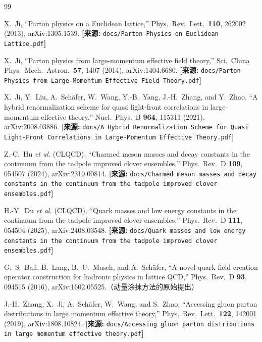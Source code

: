 \documentclass[12pt,a4paper]{ctexart}
\theoremstyle{definition}
\begin{document}
\begin{thebibliography}{99}

X.~Ji,
``Parton physics on a Euclidean lattice,''
Phys.\ Rev.\ Lett.\ \textbf{110}, 262002 (2013), arXiv:1305.1539.
\quad\textbf{[来源:} \texttt{docs/Parton Physics on Euclidean Lattice.pdf}\textbf{]}

X.~Ji,
``Parton physics from large-momentum effective field theory,''
Sci.\ China Phys.\ Mech.\ Astron.\ \textbf{57}, 1407 (2014), arXiv:1404.6680.
\quad\textbf{[来源:} \texttt{docs/Parton Physics from Large-Momentum Effective Field Theory.pdf}\textbf{]}

X.~Ji, Y.~Liu, A.~Sch\"afer, W.~Wang, Y.-B.~Yang, J.-H.~Zhang, and Y.~Zhao,
``A hybrid renormalization scheme for quasi light-front correlations in large-momentum effective theory,''
Nucl.\ Phys.\ B \textbf{964}, 115311 (2021), arXiv:2008.03886.
\quad\textbf{[来源:} \texttt{docs/A Hybrid Renormalization Scheme for Quasi Light-Front Correlations in Large-Momentum Effective Theory.pdf}\textbf{]}


Z.-C.~Hu \textit{et al.} (CLQCD),
``Charmed meson masses and decay constants in the continuum from the tadpole improved clover ensembles,''
Phys.\ Rev.\ D \textbf{109}, 054507 (2024), arXiv:2310.00814.
\quad\textbf{[来源:} \texttt{docs/Charmed meson masses and decay constants in the continuum from the tadpole improved clover ensembles.pdf}\textbf{]}

H.-Y.~Du \textit{et al.} (CLQCD),
``Quark masses and low energy constants in the continuum from the tadpole improved clover ensembles,''
Phys.\ Rev.\ D \textbf{111}, 054504 (2025), arXiv:2408.03548.
\quad\textbf{[来源:} \texttt{docs/Quark masses and low energy constants in the continuum from the tadpole improved clover ensembles.pdf}\textbf{]}


G.~S.~Bali, B.~Lang, B.~U.~Musch, and A.~Sch\"afer,
``A novel quark-field creation operator construction for hadronic physics in lattice QCD,''
Phys.\ Rev.\ D \textbf{93}, 094515 (2016), arXiv:1602.05525.（动量涂抹方法的原始提出）

J.-H.~Zhang, X.~Ji, A.~Sch\"afer, W.~Wang, and S.~Zhao,
``Accessing gluon parton distributions in large momentum effective theory,''
Phys.\ Rev.\ Lett.\ \textbf{122}, 142001 (2019), arXiv:1808.10824.
\quad\textbf{[来源:} \texttt{docs/Accessing gluon parton distributions in large momentum effective theory.pdf}\textbf{]}

\end{thebibliography}
\end{document}
